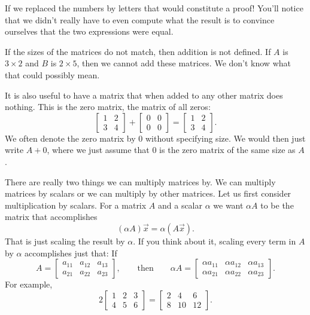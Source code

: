 \documentclass{ximera}
\begin{document}
If we replaced the numbers by letters that would constitute a proof! You'll notice that we didn't really have to even compute what the result is to convince ourselves that the two expressions were equal.

If the sizes of the matrices do not match, then addition is not defined. If $A$ is $3 \times 2$ and $B$ is $2 \times 5$, then we cannot add these matrices.  We don't know what that could possibly mean.

It is also useful to have a matrix that when added to any other matrix does nothing.  This is the zero matrix, the matrix of all zeros:
\begin{equation*}
    \begin{bmatrix}
        1 & 2 \\
        3 & 4
    \end{bmatrix}
    +
    \begin{bmatrix}
        0 & 0 \\
        0 & 0
    \end{bmatrix}
    =
    \begin{bmatrix}
        1 & 2 \\
        3 & 4
    \end{bmatrix} .
\end{equation*}
We often denote the zero matrix by $0$ without specifying size.  We would then just write $A + 0$, where we just assume that $0$ is the zero matrix of the same size as $A$.


There are really two things we can multiply matrices by.  We can multiply matrices by scalars or we can multiply by other matrices.  Let us first consider multiplication by scalars. For a matrix $A$ and a scalar $\alpha$ we want $\alpha A$ to be the matrix that accomplishes
\begin{equation*}
    (\alpha A) \vec{x} = \alpha (A \vec{x}) .
\end{equation*}
That is just scaling the result by $\alpha$.  If you think about it, scaling every term in $A$ by $\alpha$ accomplishes just that: If
\begin{equation*}
    A = 
    \begin{bmatrix}
        a_{11} & a_{12} & a_{13}  \\
        a_{21} & a_{22} & a_{23}
    \end{bmatrix},
    \qquad\text{then} \qquad \alpha A = 
    \begin{bmatrix}
        \alpha a_{11} & \alpha a_{12} & \alpha a_{13}  \\
        \alpha a_{21} & \alpha a_{22} & \alpha a_{23}
    \end{bmatrix} .
\end{equation*}
For example,
\begin{equation*}
    2
    \begin{bmatrix}
        1 & 2 & 3 \\
        4 & 5 & 6
    \end{bmatrix} =
    \begin{bmatrix}
        2 & 4 & 6 \\
        8 & 10 & 12
    \end{bmatrix} .
\end{equation*}
\end{document}
